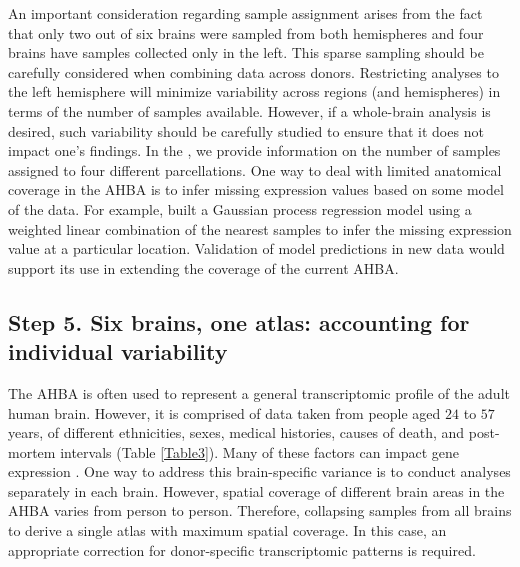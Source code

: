 \documentclass[10pt,A4]{article}
\begin{document}
An important consideration regarding sample assignment arises from the fact that only two out of six brains were sampled from both hemispheres and four brains have samples collected only in the left. This sparse sampling should be carefully considered when combining data across donors. Restricting analyses to the left hemisphere will minimize variability across regions (and hemispheres) in terms of the number of samples available. However, if a whole-brain analysis is desired, such variability should be carefully studied to ensure that it does not impact one’s findings. In the , we provide information on the number of samples assigned to four different parcellations. One way to deal with limited anatomical coverage in the AHBA is to infer missing expression values based on some model of the data. For example, \citet{Gryglewski2018} built a Gaussian process regression model using a weighted linear combination of the nearest samples to infer the missing expression value at a particular location. Validation of model predictions in new data would support its use in extending the coverage of the current AHBA.

\subsection*{Step 5. Six brains, one atlas: accounting for individual variability}

The AHBA is often used to represent a general transcriptomic profile of the adult human brain. However, it is comprised of data taken from people aged $24$ to $57$ years, of different ethnicities, sexes, medical histories, causes of death, and post-mortem intervals (Table \ref{Table3}). Many of these factors can impact gene expression \citep{Fraser2005,Berchtold2008,Kumar2013,Trabzuni2013}. One way to address this brain-specific variance is to conduct analyses separately in each brain. However, spatial coverage of different brain areas in the AHBA varies from person to person. Therefore, collapsing samples from all brains to derive a single atlas with maximum spatial coverage. In this case, an appropriate correction for donor-specific transcriptomic patterns is required.
\end{document}
